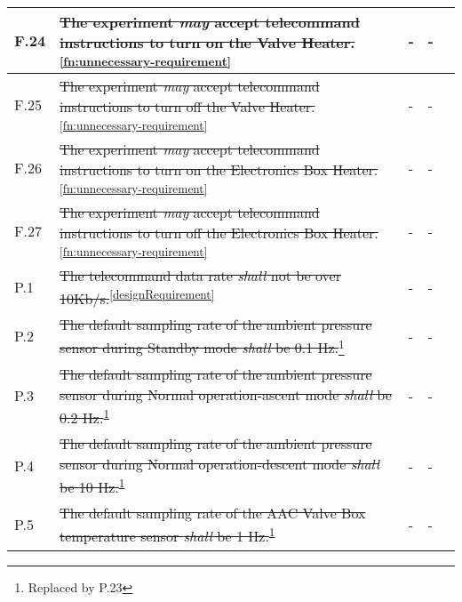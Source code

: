 \begin{longtable}[]{|m{}| m{} |m{} |m{}|m{}|}
F.24 & \st{The experiment \textit{may} accept telecommand instructions to turn on the Valve Heater.}\textsuperscript{\ref{fn:unnecessary-requirement}}                                                                                          &      -        & -            &        \\ \hline
F.25 & \st{The experiment \textit{may} accept telecommand instructions to turn off the Valve Heater.}\textsuperscript{\ref{fn:unnecessary-requirement}}                                                                                         &      -        & -            &        \\ \hline
F.26 & \st{The experiment \textit{may} accept telecommand instructions to turn on the Electronics Box Heater.}\textsuperscript{\ref{fn:unnecessary-requirement}}                                                                                     &      -        & -            &        \\ \hline
F.27 & \st{The experiment \textit{may} accept telecommand instructions to turn off the Electronics Box Heater.}\textsuperscript{\ref{fn:unnecessary-requirement}}                                                                                    &      -        & -            &        \\ \hline
P.1  & \st{The telecommand data rate \textit{shall} not be over 10Kb/s.}\textsuperscript{\ref{designRequirement}}                                                                                                                           &        -      & -          &        \\ \hline
P.2  & \st{The default sampling rate of the ambient pressure sensor during Standby mode \textit{shall} be 0.1 Hz.}\footnote{Replaced by P.23\label{replaceSoftVeri}}                                                                       &      -  & -  &        \\ \hline
P.3  & \st{The default sampling rate of the ambient pressure sensor during Normal operation-ascent mode \textit{shall} be 0.2 Hz.}\textsuperscript{\ref{replaceSoftVeri}}                                                           &    -        & -        &        \\ \hline
P.4  & \st{The default sampling rate of the ambient pressure sensor during Normal operation-descent mode \textit{shall} be 10 Hz.}\textsuperscript{\ref{replaceSoftVeri}}                                                           &   -     & -    &        \\ \hline
P.5  & \st{The default sampling rate of the AAC Valve Box temperature sensor \textit{shall} be 1 Hz.}\textsuperscript{\ref{replaceSoftVeri}}                                                                                        &     -        &  -            &        \\ \hline

\end{longtable}
